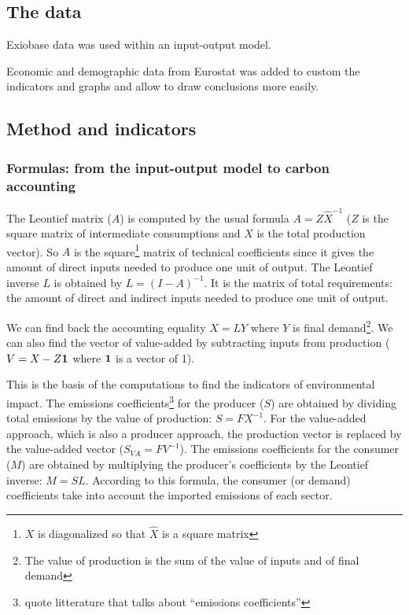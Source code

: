 \documentclass[
]{article}
\begin{document}
\hypertarget{the-data}{%
\subsection{The data}\label{the-data}}

Exiobase data was used within an input-output model.

Economic and demographic data from Eurostat was added to custom the
indicators and graphs and allow to draw conclusions more easily.

\hypertarget{method-and-indicators}{%
\subsection{Method and indicators}\label{method-and-indicators}}

\hypertarget{formulas-from-the-input-output-model-to-carbon-accounting}{%
\subsubsection{Formulas: from the input-output model to carbon
accounting}\label{formulas-from-the-input-output-model-to-carbon-accounting}}

The Leontief matrix (\(A\)) is computed by the usual formula
\(A=Z\hat{X}^{-1}\) (\(Z\) is the square matrix of intermediate
consumptions and \(X\) is the total production vector). So \(A\) is the
square\footnote{\(X\) is diagonalized so that \(\hat{X}\) is a square
  matrix} matrix of technical coefficients since it gives the amount of
direct inputs needed to produce one unit of output. The Leontief inverse
\(L\) is obtained by \(L=(I-A)^{-1}\). It is the matrix of total
requirements: the amount of direct and indirect inputs needed to produce
one unit of output.

We can find back the accounting equality \(X=LY\) where \(Y\) is final
demand\footnote{The value of production is the sum of the value of
  inputs and of final demand}. We can also find the vector of
value-added by subtracting inputs from production (\(V=X-Z\bf{1}\) where
\(\bf{1}\) is a vector of 1).

This is the basis of the computations to find the indicators of
environmental impact. The emissions coefficients\footnote{quote
  litterature that talks about ``emissions coefficients''} for the
producer (\(S\)) are obtained by dividing total emissions by the value
of production: \(S=FX^{-1}\). For the value-added approach, which is
also a producer approach, the production vector is replaced by the
value-added vector (\(S_{VA}=FV^{-1}\)). The emissions coefficients for
the consumer (\(M\)) are obtained by multiplying the producer's
coefficients by the Leontief inverse: \(M=SL\). According to this
formula, the consumer (or demand) coefficients take into account the
imported emissions of each sector.
\end{document}
